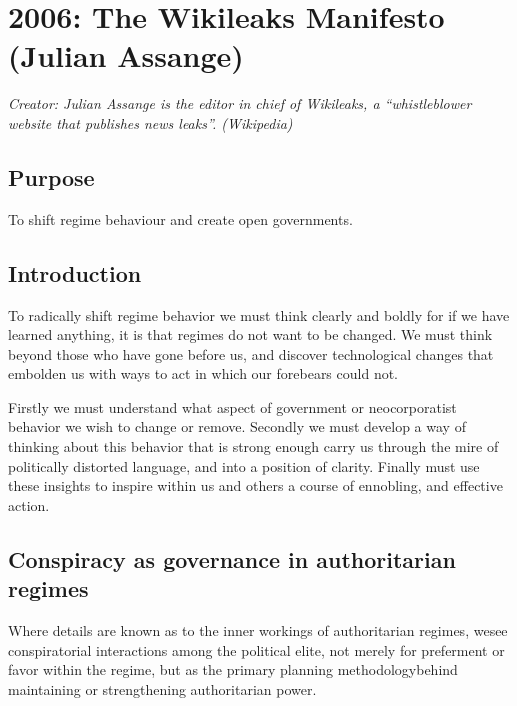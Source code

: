 \documentclass[letterpaper,12pt,english]{sphinxmanual}
\begin{document}

\chapter{2006: The Wikileaks Manifesto (Julian Assange)}
\label{assange::doc}\label{assange:index-0}\label{assange:the-wikileaks-manifesto-julian-assange}
\emph{Creator: Julian Assange is the editor in chief of Wikileaks, a “whistleblower website that publishes news leaks”. (Wikipedia)}


\section{Purpose}
\label{assange:purpose}
To shift regime behaviour and create open governments.


\section{Introduction}
\label{assange:introduction}
To radically shift regime behavior we must think clearly and boldly for if we have learned anything, it is that regimes do not want to be changed. We must think beyond those who have gone before us, and discover technological changes that embolden us with ways to act in which our forebears could not.

Firstly we must understand what aspect of government or neocorporatist behavior we wish to change or remove. Secondly we must develop a way of thinking about this behavior that is strong enough carry us through the mire of politically distorted language, and into a position of clarity. Finally must use these insights to inspire within us and others a course of ennobling, and effective action.


\section{Conspiracy as governance in authoritarian regimes}
\label{assange:conspiracy-as-governance-in-authoritarian-regimes}
Where details are known as to the inner workings of authoritarian regimes, wesee conspiratorial interactions among the political elite, not merely for preferment or favor within the regime, but as the primary planning methodologybehind maintaining or strengthening authoritarian power.
\end{document}
